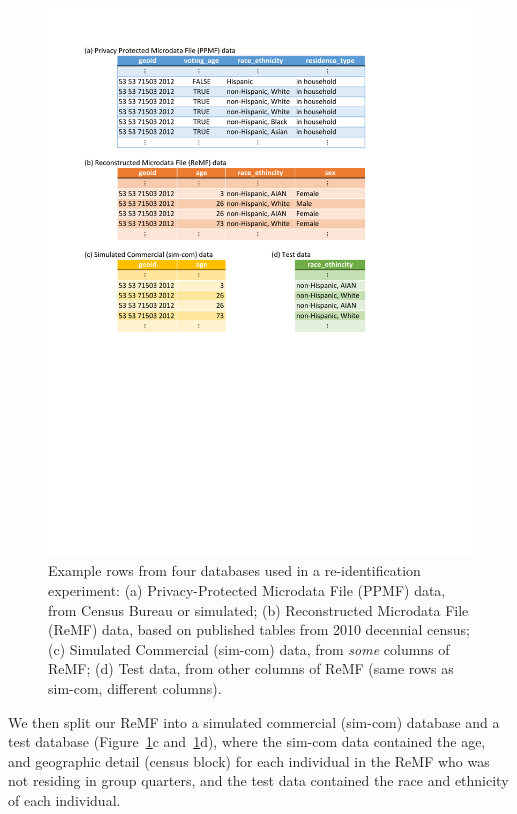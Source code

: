 \documentclass{article}
\begin{document}
\begin{figure}[ht]
\vskip 0.2in
\begin{center}
\centerline{\includegraphics[width=\columnwidth]{tex/ppmf_reid_db_fig_cropped.pdf}}
\caption{Example rows from four databases used in a re-identification experiment: (a) Privacy-Protected Microdata File (PPMF) data, from Census Bureau or simulated; (b) Reconstructed Microdata File (ReMF) data, based on published tables from 2010 decennial census; (c) Simulated Commercial (sim-com) data, from \emph{some} columns of ReMF; (d) Test data, from other columns of ReMF (same rows as sim-com, different columns).}
\label{db}
\end{center}
\vskip -0.2in
\end{figure}

We then split our ReMF into a simulated commercial (sim-com) database and a test database (Figure~\ref{db}c and~\ref{db}d), where the sim-com data contained the age, and geographic detail (census block) for each individual in the ReMF who was not residing in group quarters, and the test data contained the race and ethnicity of each individual.
\end{document}
